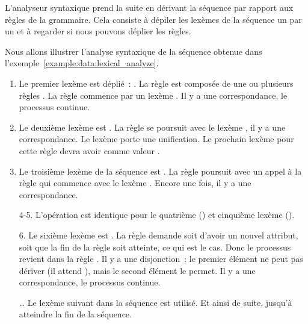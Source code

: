 L'analyseur syntaxique prend la suite en dérivant la séquence par rapport aux
règles de la grammaire. Cela consiste à dépiler les lexèmes de la séquence un
par un et à regarder si nous pouvons déplier les règles.

\begin{example}[Analyse syntaxique de \code{<a x="y"><b /><c>foo</c></a>}]
\label{example:data:syntactic_analyze}

Nous allons illustrer l'analyse syntaxique de la séquence obtenue dans
l'exem\-ple~\ref{example:data:lexical_analyze}.

\begin{enumerate}

\item Le premier lexème est déplié~: . La règle  est composée
de une ou plusieurs règles . La règle  commence par un
lexème . Il y a une correspondance, le processus continue.

\item Le deuxième lexème est . La règle  se poursuit avec
le lexème , il y a une correspondance. Le lexème  porte
une unification. Le prochain lexème  pour cette règle devra avoir
comme valeur .

\item Le troisième lexème de la séquence est . La règle 
poursuit avec un appel à la règle  qui commence avec le lexème
. Encore une fois, il y a une correspondance.

\item[4-5.] L'opération est identique pour le quatrième () et
cinquième lexème ().

\item[6.] Le sixième lexème est . La règle  demande
soit d'avoir un nouvel attribut, soit que la fin de la règle soit atteinte, ce
qui est le cas. Donc le processus revient dans la règle . Il y a une
disjonction~: le premier élément ne peut pas dériver  (il attend
), mais le second élément le permet. Il y a une correspondance, le
processus continue.

\item[…] Le lexème suivant dans la séquence est utilisé. Et ainsi de suite,
jusqu'à atteindre la fin de la séquence.

\end{enumerate}

\end{example}

